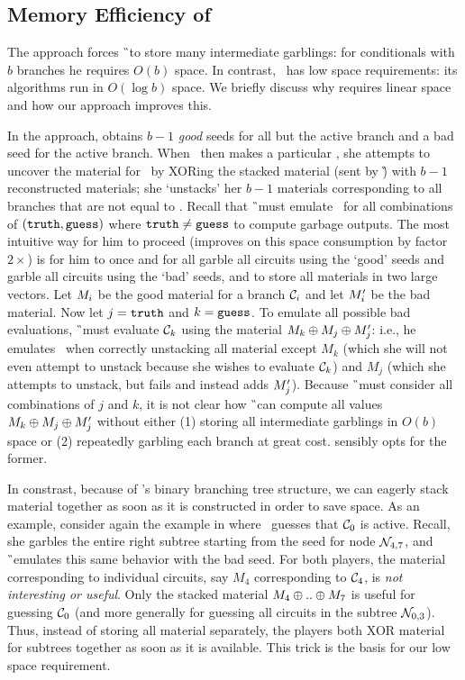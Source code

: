 \subsection{Memory Efficiency of \ourschemelong}
\label{sec:memoryEfficiency}

The \HK approach forces \G\ to store many intermediate
garblings: for conditionals with $b$ branches he requires $O(b)$ space.
In contrast, \ourschemelong\ has low space requirements: its
algorithms run in $O(\log b)$ space.
%
We briefly discuss why \HK requires linear space and how our approach
improves this.

In the \HK approach, \E obtains $b-1$ \emph{good} seeds for all but the
active branch and a bad seed for the active branch.
%
When \E\ then makes a particular \guess, she attempts to uncover the
material for \guess\ by XORing the stacked material (sent by \G) with
$b-1$ reconstructed materials; she `unstacks' her $b-1$ materials
corresponding to all branches that are not equal to \guess.
%
Recall that \G\ must emulate \E\ for all combinations of $(\mathtt{truth},
\mathtt{guess})$ where $\mathtt{truth} \neq \mathtt{guess}$ to compute garbage outputs.
%
The most intuitive way for him to proceed (\HK improves on this space
consumption by factor $2\times$) is for him to once and for all garble all circuits using the `good'
seeds and garble all circuits using the `bad' seeds, and to
store all materials in two large vectors.
Let $M_i$ be the good material for a branch $\mathcal C_i$ and let $M'_i$ be
the bad material.
%
Now let $j = \mathtt{truth}$ and $k = \mathtt{guess}$.
To emulate all possible bad evaluations, \G\ must evaluate $\mathcal C_k$
using the material $M_k \oplus M_j \oplus M_j'$:
i.e., he emulates \E\ when correctly unstacking all material except $M_k$
(which she will not even attempt to unstack because she wishes to
evaluate $\mathcal C_k$) and $M_j$ (which she attempts to unstack, but fails
and instead adds $M_j'$).
%
Because \G\ must consider all combinations of $j$ and $k$, it is not
clear how \G\ can compute all values $M_k \oplus M_j \oplus
M_j'$ without either (1) storing all intermediate garblings in
$O(b)$ space or (2) repeatedly garbling each branch at great cost.
\HK sensibly opts for the former.

In constrast, because of \ourschemelong's binary branching tree
structure, we can eagerly stack material together as soon as it is constructed
in order to save space.
%
As an example, consider again the example in  where
\E\ guesses that $\mathcal C_0$ is active.
%
Recall, she garbles the entire right subtree starting from the
seed for node $\mathtt{\cal N}_{4, 7}$, and \G\ emulates this same behavior with
the bad seed.
%
For both players, the material corresponding to individual circuits, say
$M_4$ corresponding to $\mathcal C_4$, is \emph{not interesting or useful}.
Only the stacked material $M_4 \oplus .. \oplus M_7$ is useful for
guessing $\mathcal C_0$ (and more generally for guessing all circuits in the subtree
$\mathtt{\cal N}_{0, 3}$).
Thus, instead of storing all material separately, the players both XOR
material for subtrees together as soon as it is available.
This trick is the basis for our low space requirement.

